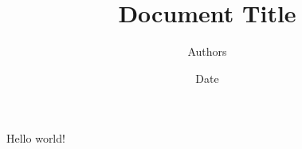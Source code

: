 \documentclass{article}
\title{Document Title}
\author{Authors}
\date{Date}
\begin{document}
   \maketitle
   Hello world! \cite{judging_forgeries}


\end{document}

